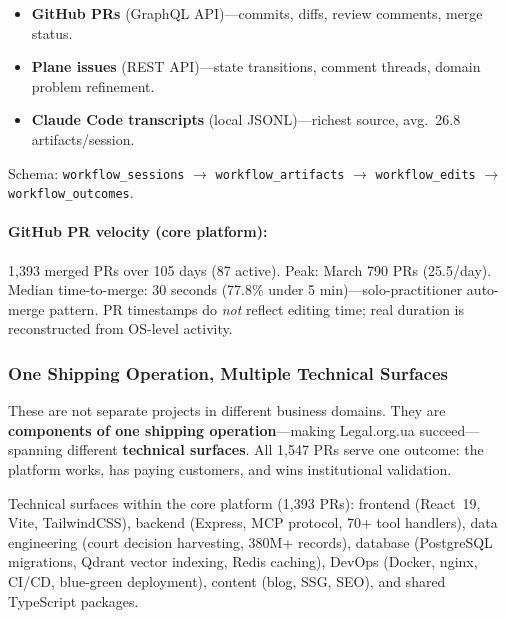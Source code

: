 \documentclass[11pt]{article}
\begin{document}
\begin{itemize}[nosep]
  \item \textbf{GitHub PRs} (GraphQL API)---commits, diffs, review comments, merge status.
  \item \textbf{Plane issues} (REST API)---state transitions, comment threads, domain problem refinement.
  \item \textbf{Claude Code transcripts} (local JSONL)---richest source, avg.\ 26.8 artifacts/session.
\end{itemize}

\noindent Schema: \texttt{workflow\_sessions} $\to$ \texttt{workflow\_artifacts} $\to$ \texttt{workflow\_edits} $\to$ \texttt{workflow\_outcomes}.

\paragraph{GitHub PR velocity (core platform):}
1{,}393 merged PRs over 105 days (87 active).
Peak: March 790 PRs (25.5/day).
Median time-to-merge: 30 seconds (77.8\% under 5 min)---solo-practitioner auto-merge pattern.
PR timestamps do \emph{not} reflect editing time; real duration is reconstructed from OS-level activity.

\subsubsection{One Shipping Operation, Multiple Technical Surfaces}
\label{sec:technical-surfaces}

These are not separate projects in different business domains.
They are \textbf{components of one shipping operation}---making Legal.org.ua succeed---spanning different \textbf{technical surfaces}.
All 1{,}547 PRs serve one outcome: the platform works, has paying customers, and wins institutional validation.

Technical surfaces within the core platform (1{,}393 PRs): frontend (React~19, Vite, TailwindCSS), backend (Express, MCP protocol, 70+ tool handlers), data engineering (court decision harvesting, 380M+ records), database (PostgreSQL migrations, Qdrant vector indexing, Redis caching), DevOps (Docker, nginx, CI/CD, blue-green deployment), content (blog, SSG, SEO), and shared TypeScript packages.
\end{document}
